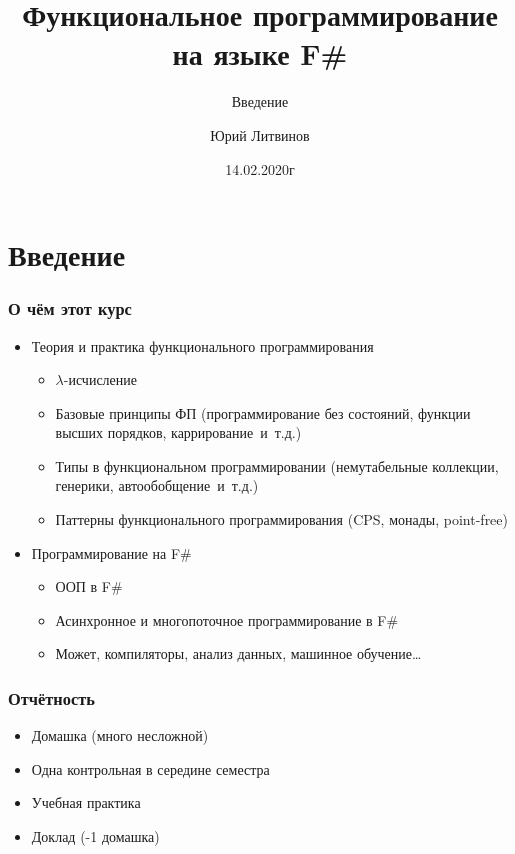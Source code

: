 \documentclass[xetex,mathserif,serif]{beamer}
\title{Функциональное программирование на языке F\#}
\subtitle{Введение}
\author{Юрий Литвинов}
\date{14.02.2020г}
\begin{document}
	
	\frame{\titlepage}
	
	\section{Введение}
	
	\begin{frame}
		\frametitle{О чём этот курс}
		\begin{itemize}
			\item Теория и практика функционального программирования
			\begin{itemize}
				\item $\lambda$-исчисление
				\item Базовые принципы ФП (программирование без состояний, функции высших порядков, каррирование~и~т.д.)
				\item Типы в функциональном программировании (немутабельные коллекции,
					генерики, автообобщение~и~т.д.)
				\item Паттерны функционального программирования (CPS, монады, point-free)
			\end{itemize}
			\item Программирование на F\# 
			\begin{itemize}
				\item ООП в F\#
				\item Асинхронное и многопоточное программирование в F\#
				\item Может, компиляторы, анализ данных, машинное обучение\dots
			\end{itemize}
		\end{itemize}
	\end{frame}

	\begin{frame}
		\frametitle{Отчётность}
		\begin{itemize}
			\item Домашка (много несложной)
			\item Одна контрольная в середине семестра
			\item Учебная практика
			\item Доклад (-1 домашка)
		\end{itemize}
	\end{frame}
	
\end{document}
